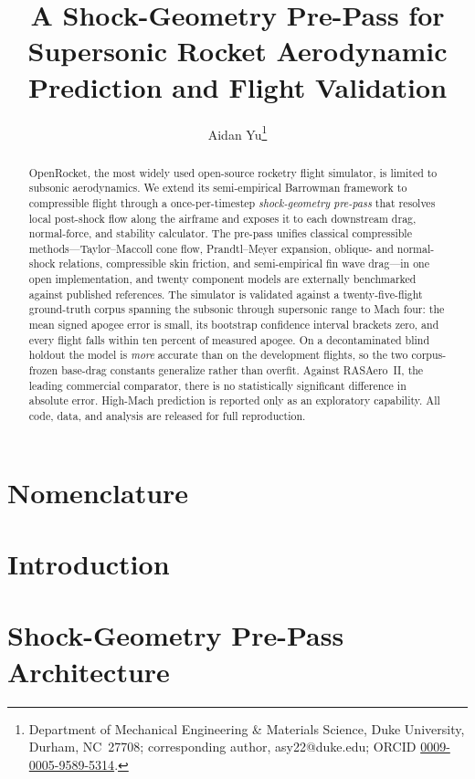 \documentclass[journal]{new-aiaa}
\title{A Shock-Geometry Pre-Pass for Supersonic Rocket Aerodynamic Prediction and Flight Validation}
\author{Aidan Yu\footnote{Department of Mechanical Engineering \& Materials Science, Duke University, Durham, NC~27708; corresponding author, asy22@duke.edu; ORCID \href{https://orcid.org/0009-0005-9589-5314}{0009-0005-9589-5314}.}}
\affil{Department of Mechanical Engineering \& Materials Science, Duke University}
\begin{document}
\maketitle

\begin{abstract}
OpenRocket, the most widely used open-source rocketry flight simulator, is
limited to subsonic aerodynamics. We extend its semi-empirical Barrowman
framework to compressible flight through a once-per-timestep \emph{shock-geometry
pre-pass} that resolves local post-shock flow along the airframe and exposes it
to each downstream drag, normal-force, and stability calculator. The pre-pass
unifies classical compressible methods---Taylor--Maccoll cone flow,
Prandtl--Meyer expansion, oblique- and normal-shock relations, compressible skin
friction, and semi-empirical fin wave drag---in one open implementation, and
twenty component models are externally benchmarked against published references.
The simulator is validated against a twenty-five-flight ground-truth corpus
spanning the subsonic through supersonic range to Mach four: the mean signed
apogee error is small, its bootstrap confidence interval brackets zero, and every
flight falls within ten percent of measured apogee. On a decontaminated blind
holdout the model is \emph{more} accurate than on the development flights, so the
two corpus-frozen base-drag constants generalize rather than overfit. Against
RASAero~II, the leading commercial comparator, there is no statistically
significant difference in absolute error. High-Mach prediction is reported only
as an exploratory capability. All code, data, and analysis are released for full
reproduction.
\end{abstract}

\section*{Nomenclature}


\section{Introduction}\label{sec:intro}


\section{Shock-Geometry Pre-Pass Architecture}\label{sec:prepass}

\end{document}
